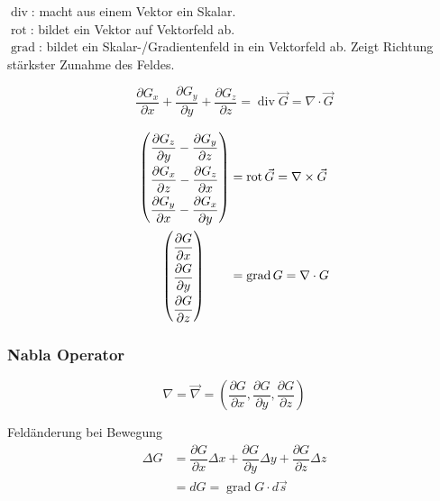 $\operatorname{div}$: macht aus einem Vektor ein Skalar.\\
$\operatorname{rot}$: bildet ein Vektor auf Vektorfeld ab.\\
$\operatorname{grad}$: bildet ein Skalar-/Gradientenfeld in ein Vektorfeld ab.
Zeigt Richtung stärkster Zunahme des Feldes.

\[
    \dfrac{\partial G_x}{\partial x} + \dfrac{\partial G_y}{\partial y} +
    \dfrac{\partial G_z}{\partial z} = \operatorname{div} \vec{G} = \nabla
    \cdot \vec{G}
\]

\begin{align*}
    \arraycolsep=1.0pt\def\arraystretch{2.0}
    \begin{pmatrix}
        \dfrac{\partial G_z}{\partial y} - \dfrac{\partial G_y}{\partial z} \\
        \dfrac{\partial G_x}{\partial z} - \dfrac{\partial G_z}{\partial x} \\
        \dfrac{\partial G_y}{\partial x} - \dfrac{\partial G_x}{\partial y} \\
    \end{pmatrix} & = \operatorname{rot} \vec{G} = \nabla \times \vec{G}                                 \\
    \arraycolsep=1.0pt\def\arraystretch{2.0}
    \begin{pmatrix}
        \dfrac{\partial G}{\partial x} \\
        \dfrac{\partial G}{\partial y} \\
        \dfrac{\partial G}{\partial z} \\
    \end{pmatrix} \qquad                                      & = \operatorname{grad} G = \nabla \cdot G
\end{align*}

\subsubsection*{Nabla Operator}

\[
    \nabla = \vec{\nabla} = \left( \dfrac{\partial G}{\partial x},
    \dfrac{\partial G}{\partial y}, \dfrac{\partial G}{\partial z} \right)
\]

Feldänderung bei Bewegung
\begin{align*}
    \Delta G & = \dfrac{\partial G}{\partial x} \Delta x + \dfrac{\partial G}{\partial y} \Delta y + \dfrac{\partial G}{\partial z} \Delta z \\
             & = dG = \operatorname{grad} G \cdot d \vec{s}
\end{align*}

